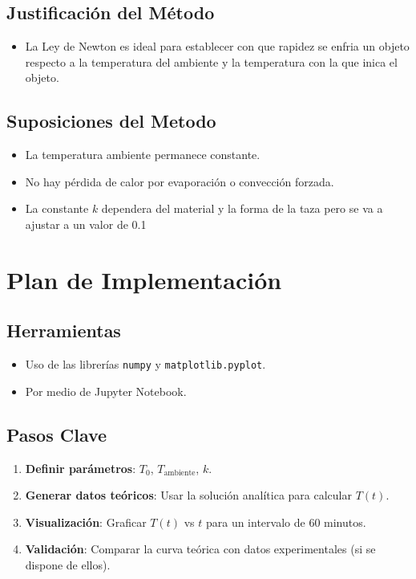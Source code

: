 \documentclass{article}
\begin{document}
\subsection{Justificación del Método}
\begin{itemize}
    \item La Ley de Newton es ideal para establecer con que rapidez se enfria un objeto respecto a la temperatura del ambiente y la temperatura con la que inica el objeto.
\end{itemize}

\subsection{Suposiciones del Metodo}
\begin{itemize}
    \item La temperatura ambiente permanece constante.
    \item No hay pérdida de calor por evaporación o convección forzada.
    \item La constante \(k\) dependera del material y la forma de la taza pero se va a ajustar a un valor de 0.1
\end{itemize}

\section{Plan de Implementación}
\subsection{Herramientas}
\begin{itemize}
    \item Uso de las librerías \texttt{numpy} y \texttt{matplotlib.pyplot}.
    \item Por medio de Jupyter Notebook.
\end{itemize}

\subsection{Pasos Clave}
\begin{enumerate}
    \item \textbf{Definir parámetros}: \(T_0\), \(T_{\text{ambiente}}\), \(k\).
    \item \textbf{Generar datos teóricos}: Usar la solución analítica para calcular \(T(t)\).
    \item \textbf{Visualización}: Graficar \(T(t)\) vs \(t\) para un intervalo de 60 minutos.
    \item \textbf{Validación}: Comparar la curva teórica con datos experimentales (si se dispone de ellos).
\end{enumerate}
\end{document}
